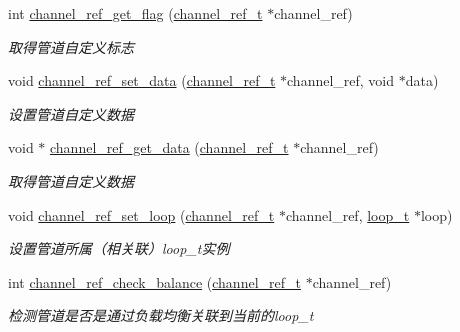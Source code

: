 \begin{DoxyCompactItemize}
int \hyperlink{a00047_a684027d23ecd45142ee91678972b48da_a684027d23ecd45142ee91678972b48da}{channel\+\_\+ref\+\_\+get\+\_\+flag} (\hyperlink{a00050_a151271c9d188ef28d4d24bb81dcc1263_a151271c9d188ef28d4d24bb81dcc1263}{channel\+\_\+ref\+\_\+t} $\ast$channel\+\_\+ref)
\begin{DoxyCompactList}\small\item\em 取得管道自定义标志 \end{DoxyCompactList}\item 
void \hyperlink{a00047_aa639e4f322194aa76b0d01368f086bc0_aa639e4f322194aa76b0d01368f086bc0}{channel\+\_\+ref\+\_\+set\+\_\+data} (\hyperlink{a00050_a151271c9d188ef28d4d24bb81dcc1263_a151271c9d188ef28d4d24bb81dcc1263}{channel\+\_\+ref\+\_\+t} $\ast$channel\+\_\+ref, void $\ast$data)
\begin{DoxyCompactList}\small\item\em 设置管道自定义数据 \end{DoxyCompactList}\item 
void $\ast$ \hyperlink{a00047_ae6545b9c070a0bab99ccfefdf0b4a999_ae6545b9c070a0bab99ccfefdf0b4a999}{channel\+\_\+ref\+\_\+get\+\_\+data} (\hyperlink{a00050_a151271c9d188ef28d4d24bb81dcc1263_a151271c9d188ef28d4d24bb81dcc1263}{channel\+\_\+ref\+\_\+t} $\ast$channel\+\_\+ref)
\begin{DoxyCompactList}\small\item\em 取得管道自定义数据 \end{DoxyCompactList}\item 
void \hyperlink{a00047_ad7b9246a8768f761ffdd1756ea389181_ad7b9246a8768f761ffdd1756ea389181}{channel\+\_\+ref\+\_\+set\+\_\+loop} (\hyperlink{a00050_a151271c9d188ef28d4d24bb81dcc1263_a151271c9d188ef28d4d24bb81dcc1263}{channel\+\_\+ref\+\_\+t} $\ast$channel\+\_\+ref, \hyperlink{a00050_a9c3ad1cd2de83e09f3a7b59fa82c94ee_a9c3ad1cd2de83e09f3a7b59fa82c94ee}{loop\+\_\+t} $\ast$loop)
\begin{DoxyCompactList}\small\item\em 设置管道所属（相关联）loop\+\_\+t实例 \end{DoxyCompactList}\item 
int \hyperlink{a00101_gae003fde214ddbf4feec22ddb89b8257c_gae003fde214ddbf4feec22ddb89b8257c}{channel\+\_\+ref\+\_\+check\+\_\+balance} (\hyperlink{a00050_a151271c9d188ef28d4d24bb81dcc1263_a151271c9d188ef28d4d24bb81dcc1263}{channel\+\_\+ref\+\_\+t} $\ast$channel\+\_\+ref)
\begin{DoxyCompactList}\small\item\em 检测管道是否是通过负载均衡关联到当前的loop\+\_\+t \end{DoxyCompactList}\item 

\end{DoxyCompactItemize}
